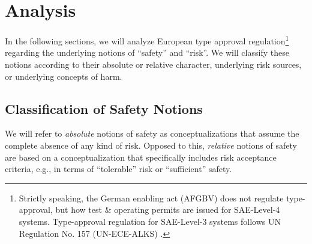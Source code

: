\section{Analysis}
\label{sec:analysis}
In the following sections, we will analyze European type approval regulation\footnote{Strictly speaking, the German enabling act (AFGBV) does not regulate type-approval, but how test \& operating permits are issued for SAE-Level-4 systems. Type-approval regulation for SAE-Level-3 systems follows UN Regulation No. 157 (UN-ECE-ALKS) \parencite{un157}.} regarding the underlying notions of ``safety'' and ``risk''.
We will classify these notions according to their absolute or relative character, underlying risk sources, or underlying concepts of harm.

\subsection{Classification of Safety Notions}
\label{sec:safety-notions}
We will refer to \emph{absolute} notions of safety as conceptualizations that assume the complete absence of any kind of risk.
Opposed to this, \emph{relative} notions of safety are based on a conceptualization that specifically includes risk acceptance criteria, e.g., in terms of ``tolerable'' risk or ``sufficient'' safety.

